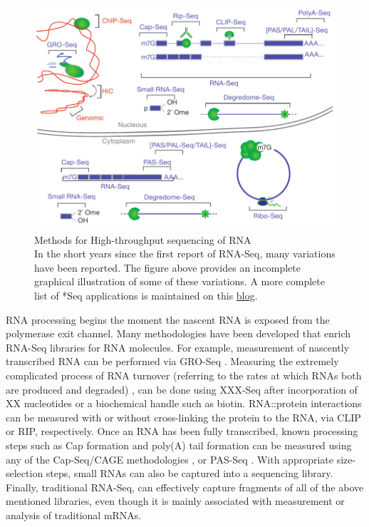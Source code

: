 \begin{figure}[htbp]
	\centering 
	\includegraphics{Figures/Chapter1/RNA_Sequencing_methodologies.pdf}
	\caption[Methods for High-throughput sequencing of RNA]
	{
		Methods for High-throughput sequencing of RNA\\[0.25cm]
		In the short years since the first report of RNA-Seq, many variations have been reported. The figure above provides an incomplete graphical illustration of some of these variations. A more complete list of *Seq applications is maintained on this \href{http://liorpachter.wordpress.com/seq/}{blog}.
	}
	\label{fig:htsMethods}
\end{figure}

RNA processing begins the moment the nascent RNA is exposed from the polymerase exit channel. Many methodologies have been developed that enrich RNA-Seq libraries for RNA molecules. For example, measurement of nascently transcribed RNA can be performed via GRO-Seq \citep{Core2008a}. Measuring the extremely complicated process of RNA turnover (referring to the rates at which RNAs both are produced and degraded) \citep{Ghosh2010a}, can be done using XXX-Seq after incorporation of XX nucleotides or a biochemical handle such as biotin. 
RNA::protein interactions can be measured with or without cross-linking the protein to the RNA, via CLIP or RIP, respectively. Once an RNA has been fully transcribed, known processing steps such as Cap formation and poly(A) tail formation can be measured using any of the Cap-Seq/CAGE methodologies \citep{Shiraki2003a}, or PAS-Seq \citep{Shepard2011}. With appropriate size-selection steps, small RNAs \citep{Ghildiyal2008} can also be captured into a sequencing library. Finally, traditional RNA-Seq, can effectively capture fragments of all of the above mentioned libraries, even though it is mainly associated with measurement or analysis of traditional mRNAs.

